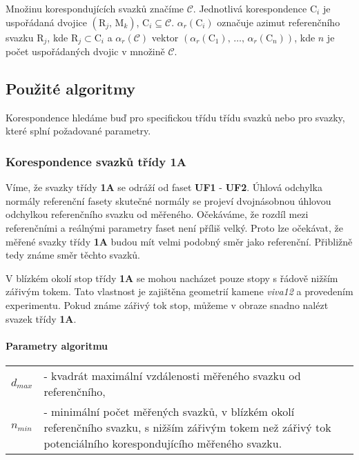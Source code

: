 Množinu korespondujících svazků značíme $\mathcal{C}$. Jednotlivá korespondence $\mathrm{C}_i$ je uspořádaná dvojice $\left(\mathrm{R}_j,\,\mathrm{M}_k \right)$, $\mathrm{C}_i \subseteq \mathcal{C}$. $\alpha_{r}(\mathrm{C}_i)$ označuje azimut referenčního svazku $\mathrm{R}_j$, kde $\mathrm{R}_j \subset \mathrm{C}_i$ a $\alpha_{r}(\mathcal{C})$ vektor $\left(\alpha_{r}(\mathrm{C}_1),\,\dots,\,\alpha_{r}(\mathrm{C}_n)\right)$, kde $n$ je počet uspořádaných dvojic v množině $\mathcal{C}$.
	
	 

\subsection{Použité algoritmy}
	Korespondence hledáme buď pro specifickou třídu třídu svazků nebo pro svazky, které splní požadované parametry. 

\subsubsection{Korespondence svazků třídy \textbf{1A}}
\label{sec: 1A}

Víme, že svazky třídy \textbf{1A} se odráží od faset \textbf{UF1} - \textbf{UF2}. Úhlová odchylka normály referenční fasety skutečné normály se projeví dvojnásobnou úhlovou odchylkou referenčního svazku od měřeného. Očekáváme, že rozdíl mezi referenčními a reálnými parametry faset není příliš velký. Proto lze očekávat, že měřené svazky třídy \textbf{1A} budou mít velmi podobný směr jako referenční. Přibližně tedy známe směr těchto svazků.

V blízkém okolí stop třídy \textbf{1A} se mohou nacházet pouze stopy s řádově nižším zářivým tokem. Tato vlastnost je zajištěna geometrií kamene \textit{viva12} a provedením experimentu. Pokud známe zářivý tok stop, můžeme v obraze snadno nalézt svazek třídy \textbf{1A}. 

\paragraph{Parametry algoritmu}
\hspace{1mm}
	 
	 \begin{tabular}{l l}
	 $d_{max}$ & - kvadrát maximální vzdálenosti měřeného svazku od referenčního,\\
	 $n_{min}$ & - minimální počet měřených svazků, v blízkém okolí referenčního svazku, s nižším zářivým tokem než zářivý tok potenciálního korespondujícího měřeného svazku. \\
	 \end{tabular}
	
